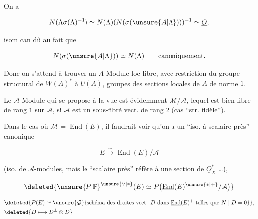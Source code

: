 
On a

\[
N(\Lambda\sigma(\Lambda)^{-1})\simeq N(\Lambda)(N(\sigma(\unsure{A|\Lambda})))^{-1}\simeq\underline O,
\]

isom can dû au fait que

\[
N(\sigma(\unsure{A|\Lambda}))\simeq N(\Lambda)\qquad\text{canoniquement.}
\]

Donc on s'attend à trouver un $A$-Module loc libre, avec restriction du groupe structural de $W(A)^*$ à $U(A)$,  groupes des sections locales de $A$ de norme $1$.

Le $\mathcal A$-Module qui se propose à la vue est évidemment $\mathcal M/\mathcal A$, lequel est bien libre de rang $1$ sur $\mathcal A$, si $\mathcal A$ est un sous-fibré vect. de rang $2$  (cas ``str. fidèle''). 

Dans le cas où $\mathcal M=\underline{\operatorname{End}}(E)$, il faudrait voir qu'on a un ``iso. à scalaire près'' canonique

\[
E\xrightarrow{\sim}\underline{\operatorname{End}}(E)/\mathcal A
\]

(iso. de $\mathcal A$-modules, mais le ``scalaire près'' réfère à une section de $\underline O_X^*$ \ldots), 

\[
\deleted{{\unsure{P|\mathbb P}}^{\unsure{\vee|*}}(E)\simeq P\bigl(\underline{\operatorname{End}}(E)^{\unsure{*|+}}/\mathcal A\bigr)}
\]

\margin{$\begin{gathered}|\\|\\|\\\unsure{!|\vert}\\)\end{gathered}$}



\[
\begin{aligned}
&\deleted{P(E)\simeq\unsure{\mathcal Q}\{\text{schéma des droites vect. }D\text{ dans }\underline{\operatorname{End}}(E)^+\text{ telles que }N\mid D=0\}},\\
&\deleted{D\longmapsto D^{\perp}\otimes D}
\end{aligned}
\]
